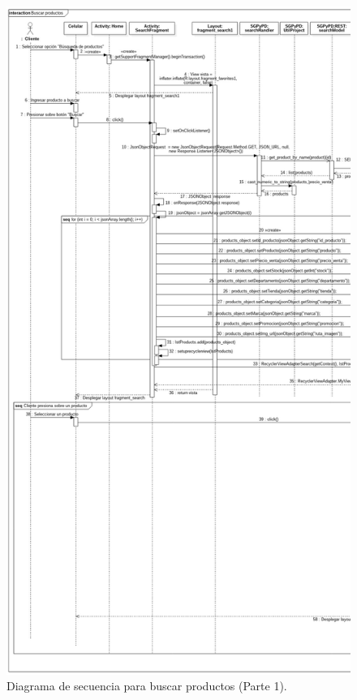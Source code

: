 \FloatBarrier
\begin{figure}[htbp!]
		\centering
			\includegraphics[width=.65 \textwidth]{imagenes/Diagramas_UserApp/Nuevos_diagramas/buscarPoductos1}
		\caption{Diagrama de secuencia para buscar productos (Parte 1).}
		\label{image:busca2}
\end{figure}
\FloatBarrier

